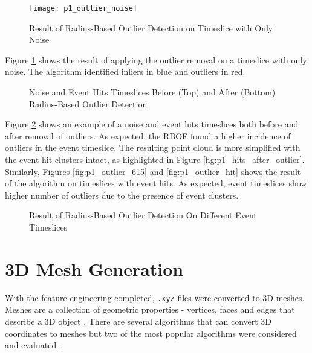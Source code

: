 \begin{figure} [ht!]
    \centering
    \texttt{[image: p1\_outlier\_noise]}
    \caption{Result of Radius-Based Outlier Detection on Timeslice with Only Noise}
    \label{fig:p1_outlier_noise}
\end{figure}

Figure \ref{fig:p1_outlier_noise} shows the result of applying the outlier removal on a timeslice with only noise. The algorithm identified inliers in blue and outliers in red. 

\begin{figure}[htb!]   
\centering
{}
\hspace{0.1cm}
\caption[]{Noise and Event Hits Timeslices Before (Top) and After (Bottom) Radius-Based Outlier Detection}
\label{fig:before_after_outlier}
\end{figure}

Figure \ref{fig:before_after_outlier} shows an example of a noise and event hits timeslices both before and after removal of outliers. As expected, the RBOF found a higher incidence of outliers in the event timeslice. The resulting point cloud is more simplified with the event hit clusters intact, as highlighted in Figure \ref{fig:p1_hits_after_outlier}. Similarly, Figures \ref{fig:p1_outlier_615} and \ref{fig:p1_outlier_hit} shows the result of the algorithm on timeslices with event hits. As expected, event timeslices show higher number of outliers due to the presence of event clusters.

\begin{figure}[htb!]   
\centering
{}

\caption[]{Result of Radius-Based Outlier Detection On Different Event Timeslices}
\label{fig:p1_outlier_removal}
\end{figure}

\section{3D Mesh Generation}
With the feature engineering completed, \texttt{.xyz} files were converted to 3D meshes. Meshes are a collection of geometric properties - vertices, faces and edges that describe a 3D object \cite{kim2006complete}. There are several algorithms that can convert 3D coordinates to meshes but two of the most popular algorithms were considered and evaluated \cite{kim2006complete}.

